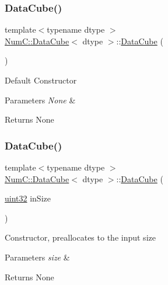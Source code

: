 \subsubsection{\texorpdfstring{Data\+Cube()}{DataCube()}\hspace{0.1cm}{\footnotesize\ttfamily [1/2]}}
{\footnotesize\ttfamily template$<$typename dtype $>$ \\
\mbox{\hyperlink{class_num_c_1_1_data_cube}{Num\+C\+::\+Data\+Cube}}$<$ dtype $>$\+::\mbox{\hyperlink{class_num_c_1_1_data_cube}{Data\+Cube}} (\begin{DoxyParamCaption}{ }\end{DoxyParamCaption})\hspace{0.3cm}{\ttfamily [inline]}}

Default Constructor


\begin{DoxyParams}{Parameters}
{\em None} & \\
\hline
\end{DoxyParams}
\begin{DoxyReturn}{Returns}
None 
\end{DoxyReturn}
\mbox{\label{class_num_c_1_1_data_cube_a2582be5bb1e460a945be6170d103eab7}} 
\subsubsection{\texorpdfstring{Data\+Cube()}{DataCube()}\hspace{0.1cm}{\footnotesize\ttfamily [2/2]}}
{\footnotesize\ttfamily template$<$typename dtype $>$ \\
\mbox{\hyperlink{class_num_c_1_1_data_cube}{Num\+C\+::\+Data\+Cube}}$<$ dtype $>$\+::\mbox{\hyperlink{class_num_c_1_1_data_cube}{Data\+Cube}} (\begin{DoxyParamCaption}\item[{\mbox{\hyperlink{namespace_num_c_ae685802ca6d3035f2b400b081e3953fa}{uint32}}}]{in\+Size }\end{DoxyParamCaption})\hspace{0.3cm}{\ttfamily [inline]}}

Constructor, preallocates to the input size


\begin{DoxyParams}{Parameters}
{\em size} & \\
\hline
\end{DoxyParams}
\begin{DoxyReturn}{Returns}
None 
\end{DoxyReturn}


